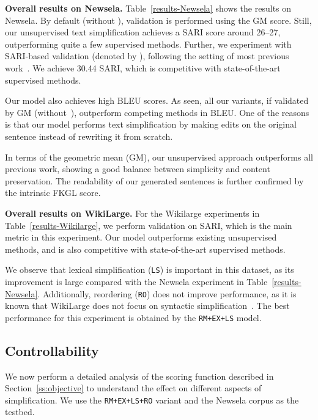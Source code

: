\documentclass[11pt,a4paper]{article}
\begin{document}
\textbf{Overall results on Newsela.}
 Table~\ref{results-Newsela} shows the results on Newsela. By default (without ), validation is performed using the GM score. Still, our unsupervised text simplification achieves a SARI score around 26--27, outperforming quite a few supervised methods. Further, we experiment with SARI-based validation (denoted by ), following the setting of most previous work~\cite{dong2019editnts,guo2018dynamic}. We achieve 30.44 SARI, which is competitive with state-of-the-art supervised methods.


Our model also achieves high BLEU scores. As seen, all our variants, if validated by GM (without~), outperform competing methods in BLEU. One of the reasons is that our model performs text simplification by making edits on the original sentence instead of rewriting it from scratch.

In terms of the geometric mean (GM), our unsupervised approach outperforms all previous work, showing a good balance between simplicity and content preservation. The readability of our generated sentences is further confirmed by the intrinsic FKGL score.

\textbf{Overall results on WikiLarge.}
For the Wikilarge experiments in Table~\ref{results-Wikilarge}, we perform validation on SARI, which is the main metric in this experiment. Our model outperforms existing unsupervised methods, and is also competitive with  state-of-the-art supervised methods. 

We observe that lexical simplification ({\tt LS}) is important in this dataset, as its improvement is large compared with the Newsela experiment in Table~\ref{results-Newsela}.
 Additionally, reordering ({\tt RO}) does not improve performance, as it is known that WikiLarge does not focus on syntactic simplification~\cite{xu-etal-2016-optimizing}.
The best performance for this experiment is obtained by the {\tt RM+EX+LS} model.





\subsection{Controllability}
\label{adaptability}

We now perform a detailed analysis of the scoring function described in Section~\ref{ss:objective} to understand the effect on different aspects of simplification.  We use the  {\tt RM+EX+LS+RO} variant and the Newsela corpus as the testbed.
\end{document}
